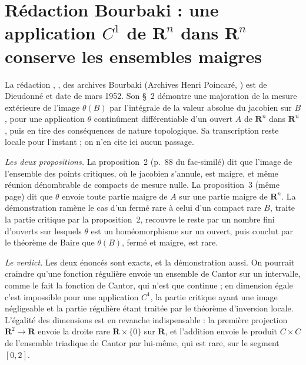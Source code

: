 \section[Rédaction Bourbaki \redac{162} : images des ensembles maigres par une application $C^1$]{Rédaction Bourbaki  : une application $C^1$ de $\mathbf R^n$ dans $\mathbf R^n$ conserve les ensembles maigres\protect{}}\label{sec:bourbaki-162}

La rédaction , , des archives Bourbaki (Archives Henri Poincaré, ) est de Dieudonné et date de mars 1952. Son §~2 démontre une majoration de la mesure extérieure de l'image $\theta(B)$ par l'intégrale de la valeur absolue du jacobien sur $B$, pour une application $\theta$ continûment différentiable d'un ouvert $A$ de $\mathbf R^n$ dans $\mathbf R^n$, puis en tire des conséquences de nature topologique. Sa transcription reste locale pour l'instant ; on n'en cite ici aucun passage.

\emph{Les deux propositions.} La proposition~2 (p.~88 du fac-similé) dit que l'image de l'ensemble des points critiques, où le jacobien s'annule, est maigre, et même réunion dénombrable de compacts de mesure nulle. La proposition~3 (même page) dit que $\theta$ envoie toute partie maigre de $A$ sur une partie maigre de $\mathbf R^n$. La démonstration ramène le cas d'un fermé rare à celui d'un compact rare $B$, traite la partie critique par la proposition~2, recouvre le reste par un nombre fini d'ouverts sur lesquels $\theta$ est un homéomorphisme sur un ouvert, puis conclut par le théorème de Baire que $\theta(B)$, fermé et maigre, est rare.

\emph{Le verdict.} Les deux énoncés sont exacts, et la démonstration aussi. On pourrait craindre qu'une fonction régulière envoie un ensemble de Cantor sur un intervalle, comme le fait la fonction de Cantor, qui n'est que continue ; en dimension égale c'est impossible pour une application $C^1$, la partie critique ayant une image négligeable et la partie régulière étant traitée par le théorème d'inversion locale. L'égalité des dimensions est en revanche indispensable : la première projection $\mathbf R^2 \to \mathbf R$ envoie la droite rare $\mathbf R \times \{0\}$ sur $\mathbf R$, et l'addition envoie le produit $C \times C$ de l'ensemble triadique de Cantor par lui-même, qui est rare, sur le segment $[0, 2]$.

